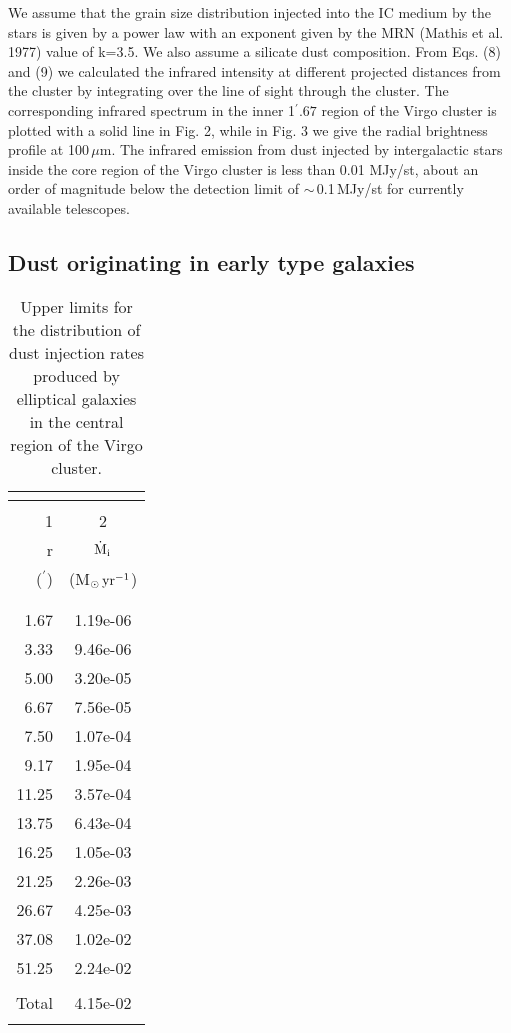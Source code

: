\documentclass[]{aa}
\begin{document}
We assume that the grain size distribution injected into the IC medium by the
stars is given by a power law with an exponent given by the MRN (Mathis et al. 
1977) value of k=3.5. We also assume a silicate dust 
composition. From Eqs. (8) and (9) we calculated the infrared
intensity at different projected distances from 
the cluster by integrating over
the line of sight through the cluster. The corresponding infrared spectrum 
in the inner 1$^{\prime}.67$ region of the Virgo cluster is plotted with a
solid line in Fig. 2, while in Fig. 3 we give the radial brightness profile at
100\,${\mu}$m. The infrared emission from dust injected by intergalactic stars
inside the core region of the Virgo cluster is less than 0.01 MJy/st, about
an order of magnitude below the detection limit of $\sim\,$0.1\,MJy/st for 
currently available telescopes. 

\subsection{Dust originating in early type galaxies} 

\begin{table}[htb]
\caption[] {Upper limits for the distribution of dust injection rates 
produced by elliptical galaxies in the central region  of the Virgo cluster.}
\begin{tabular}{rc}
\multicolumn{2}{l}{{\bf}}\\
\hline\hline
& \\
1      & 2 \\
r &  ${\dot{{\rm M}}}_{\rm i}$ \\
($^{\prime}$) & (M$_{\odot}\, {\rm yr}^{-1}$)\\
& \\
\hline\hline
& \\
  1.67  & 1.19e-06\\	
  3.33  & 9.46e-06\\	
  5.00  & 3.20e-05\\	
  6.67  & 7.56e-05\\	
  7.50  & 1.07e-04\\	
  9.17  & 1.95e-04\\	
 11.25  & 3.57e-04\\	
 13.75  & 6.43e-04\\	
 16.25  & 1.05e-03\\	
 21.25  & 2.26e-03\\	
 26.67  & 4.25e-03\\	
 37.08  & 1.02e-02\\	
 51.25  & 2.24e-02\\	
\hline
& \\
Total & 4.15e-02 \\	 
& \\
\hline
\end{tabular}
\end{table}
\end{document}
